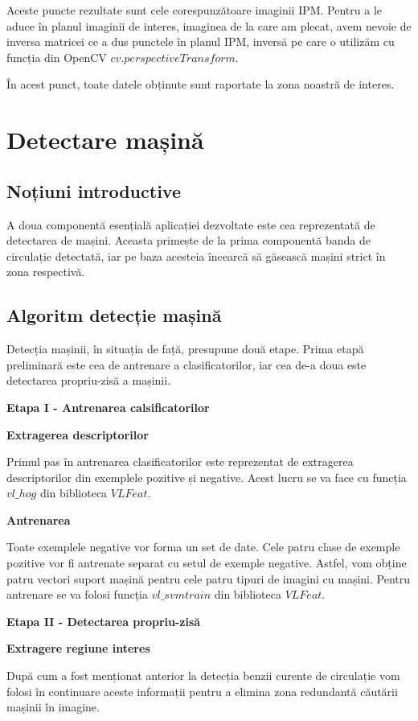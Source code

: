 Aceste puncte rezultate sunt cele corespunzătoare imaginii IPM. Pentru a le aduce în planul imaginii de interes, imaginea de la care am plecat, avem nevoie de inversa matricei ce a dus punctele în planul IPM, inversă pe care o utilizăm cu funcția din OpenCV $cv.perspectiveTransform$. 

În acest punct, toate datele obținute sunt raportate la zona noastră de interes.

\section{Detectare mașină}
\subsection*{Noțiuni introductive}

A doua componentă esențială aplicației dezvoltate este cea reprezentată de detectarea de mașini. Aceasta primește de la prima componentă banda de circulație detectată, iar pe baza acesteia încearcă să găsească mașini strict în zona respectivă.

\subsection*{Algoritm detecție mașină}
Detecția mașinii, în situația de față, presupune două etape. Prima etapă preliminară este cea de antrenare a clasificatorilor, iar cea de-a doua este detectarea propriu-zisă a mașinii.

\textbf{Etapa I - Antrenarea calsificatorilor}

\textbf{Extragerea descriptorilor}

Primul pas în antrenarea clasificatorilor este reprezentat de extragerea descriptorilor din exemplele pozitive și negative. 
Acest lucru se va face cu funcția $vl\_hog$ din biblioteca $VLFeat$. 

\textbf{Antrenarea}

Toate exemplele negative vor forma un set de date. Cele patru clase de exemple pozitive vor fi antrenate separat cu setul de exemple negative. Astfel, vom obține patru vectori suport mașină pentru cele patru tipuri de imagini cu mașini. 
Pentru antrenare se va folosi funcția $vl\_svmtrain$ din biblioteca $VLFeat$.

\textbf{Etapa II - Detectarea propriu-zisă}

\textbf{Extragere regiune interes}

După cum a fost menționat anterior la detecția benzii curente de circulație vom folosi în continuare aceste informații pentru a elimina zona redundantă căutării mașinii în imagine.

